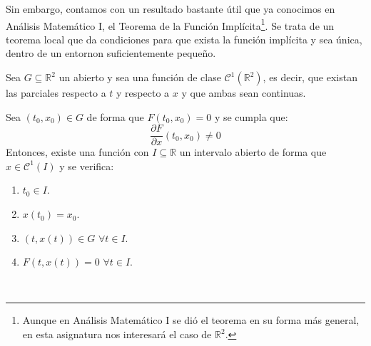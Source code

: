 Sin embargo, contamos con un resultado bastante útil que ya conocimos en Análisis Matemático I, el Teorema de la Función Implícita\footnote{Aunque en Análisis Matemático I se dió el teorema en su forma más general, en esta asignatura nos interesará el caso de $\mathbb{R}^2$.}. Se trata de un teorema local que da condiciones para que exista la función implícita y sea única, dentro de un entornon suficientemente pequeño.

\begin{teo}
    Sea $G\subseteq \mathbb{R}^2$ un abierto y sea
    una función de clase $\mathcal{C}^1(\mathbb{R}^2)$, es decir, que existan las parciales respecto a $t$ y respecto a $x$ y que ambas sean continuas.

    \noindent
    Sea $(t_0,x_0)\in G$ de forma que $F(t_0,x_0)=0$ y se cumpla que:
    \begin{equation*}
        \dfrac{\partial F}{\partial x}(t_0,x_0) \neq 0
    \end{equation*}
    Entonces, existe una función 
    con $I\subseteq \mathbb{R}$ un intervalo abierto de forma que $x\in \mathcal{C}^1(I)$ y se verifica:
    \begin{enumerate}
        \item $t_0 \in I$.
        \item $x(t_0) = x_0$.
        \item $(t,x(t))\in G$ $\forall t\in I$.
        \item $F(t,x(t))=0$ $\forall t\in I$.
    \end{enumerate}
\end{teo}~\\

%
%

